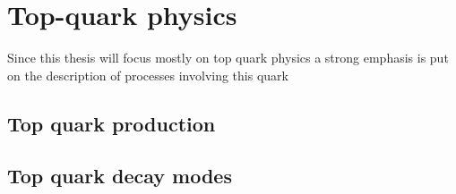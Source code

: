 \chapter{Top-quark physics} \label{sec:top_quark_physics}
Since this thesis will focus mostly on top quark physics a strong emphasis is
put on the description of processes involving this quark
\section{Top quark production} \label{sec:top_quark_production}
\section{Top quark decay modes} \label{sec:top_quark_decay_modes}
